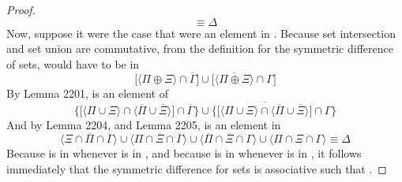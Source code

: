 \documentclass[preview]{standalone}
\begin{document}
\begin{proof}
\begin{equation*}
            \equiv
        \Delta
    \end{equation*}
    Now, suppose it were the case that \bm{$\zeta$} were an element in
    \bm{$
        \Gamma 
            \oplus 
    \big \langle \Pi \oplus \Xi \big \rangle
    $}. Because set intersection and set union are commutative,
    from the definition for the symmetric difference of sets,
    \bm{$\zeta$} would have to be in
    \begin{equation*}
        \bigg[
            \Big \langle \Pi \oplus \Xi \Big \rangle
                \cap
            \overline{\Gamma}
        \bigg]
            \cup
        \bigg[
            \Big \langle \overline{
                \Pi \oplus \Xi
            } \Big \rangle
                \cap
            \Gamma 
        \bigg]
    \end{equation*}
    By Lemma 2201, \bm{$\zeta$} is an element of
    \begin{equation*}
        \Bigg\{
            \bigg[
                \Big \langle \Pi \cup \Xi \Big \rangle
                    \cap
                \Big \langle \overline{\Pi} \cup \overline{\Xi} \Big \rangle
            \bigg]
                \cap
            \overline{\Gamma}
        \Bigg\}
            \cup
        \Bigg\{
            \bigg[ \overline{
                \Big \langle \Pi \cup \Xi \Big \rangle
                \cap
            \Big \langle \overline{\Pi} \cup \overline{\Xi} \Big \rangle
            } \bigg]
                \cap
            \Gamma
        \Bigg\}
    \end{equation*}
    And by Lemma 2204, and Lemma 2205, \bm{$\zeta$} is an element in
    \begin{equation*}
        \Big \langle \Xi \cap \overline{\Pi} \cap \overline{\Gamma} \Big \rangle
            \cup
        \Big \langle \Pi \cap \overline{\Xi} \cap \overline{\Gamma} \Big \rangle
            \cup
        \Big \langle \overline{\Pi} \cap \overline{\Xi} \cap \Gamma \Big \rangle
            \cup
        \Big \langle \Pi \cap \Xi \cap \Gamma \Big \rangle
            \equiv
        \Delta
    \end{equation*}
    Because \bm{$\zeta$} is in \bm{$\Delta$} whenever \bm{$\zeta$} is in
    \bm{$\big \langle \Gamma \oplus \Pi \big \rangle \oplus \Xi$}, 
    and because \bm{$\zeta$} is in \bm{$\Delta$} whenever \bm{$\zeta$} is in
    \bm{$\Gamma \oplus \big \langle \Pi \oplus \Xi \big \rangle$}, 
    it follows immediately that the symmetric difference for sets is associative such that 
    \bm{$
        \big \langle \Gamma \oplus \Pi \big \rangle
            \oplus 
        \Xi 
            = 
        \Gamma 
            \oplus 
        \big \langle \Pi \oplus \Xi \big \rangle
    $}.
\color{lightgray} \end{proof}
\end{document}
